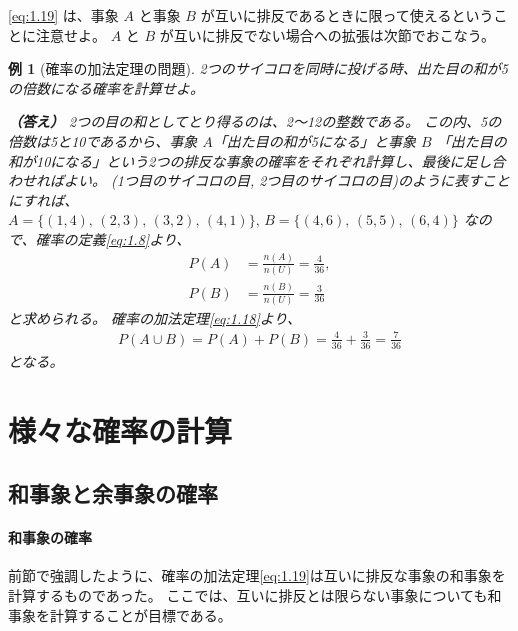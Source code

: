 \documentclass[12pt]{ltjsarticle}\usepackage{ifthen}\newcounter{enlarge}\setcounter{enlarge}{1}
\newtheorem{eg}{例}
\begin{document}
\eqref{eq:1.19} は、事象 $A$ と事象 $B$ が互いに排反であるときに限って使えるということに注意せよ。
$A$ と $B$ が互いに排反でない場合への拡張は次節でおこなう。

\begin{eg}[確率の加法定理の問題]
  2つのサイコロを同時に投げる時、出た目の和が5の倍数になる確率を計算せよ。

  \textbf{（答え）}
  2つの目の和としてとり得るのは、2〜12の整数である。
  この内、5の倍数は5と10であるから、事象 $A$「出た目の和が5になる」と事象 $B$ 「出た目の和が10になる」という2つの排反な事象の確率をそれぞれ計算し、最後に足し合わせればよい。
  (1つ目のサイコロの目, 2つ目のサイコロの目)のように表すことにすれば、$A = \{(1, 4),\, (2, 3),\, (3, 2),\, (4, 1)\},\, B = \{(4, 6),\, (5, 5),\, (6, 4)\}$ なので、確率の定義\eqref{eq:1.8}より、
  \begin{align}
    P(A) &= \frac{n(A)}{n(U)} = \frac{4}{36}, \\
    P(B) &= \frac{n(B)}{n(U)} = \frac{3}{36}
  \end{align}
  と求められる。
  確率の加法定理\eqref{eq:1.18}より、
  \begin{align}
    P(A \cup B) = P(A) + P(B) = \frac{4}{36} + \frac{3}{36} = \frac{7}{36}
  \end{align}
  となる。
\end{eg}

\section{様々な確率の計算}

\subsection{和事象と余事象の確率}

\paragraph{和事象の確率}

前節で強調したように、確率の加法定理\eqref{eq:1.19}は互いに排反な事象の和事象を計算するものであった。
ここでは、互いに排反とは限らない事象についても和事象を計算することが目標である。
\end{document}
